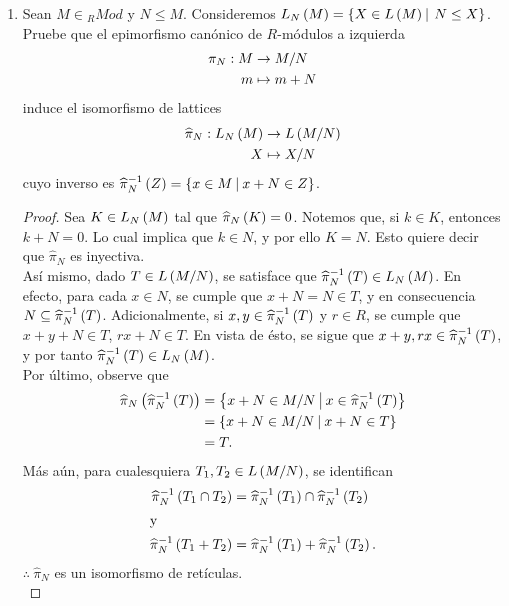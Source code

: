 \documentclass{article}
\begin{document}
\begin{enumerate}[label=\textbf{Ej \arabic*.}]
		\item Sean $M \in {}_{R}Mod$ y $N \leq M$. Consideremos $L_{N}\lrprth{M}=\descset{X}{L\lrprth{M}}{N \leq X}$. Pruebe que el epimorfismo canónico de $R$-módulos a izquierda
		\begin{align*}
			\pi_{N}: M &\rightarrow M/N\\ m &\mapsto m+N 
		\end{align*}
		induce el isomorfismo de lattices
		\begin{align*}
			\widehat{\pi}_{N}: L_{N}\left(M\right) &\rightarrow L\left(M/N\right)\\ X &\mapsto X/N 
		\end{align*}
		cuyo inverso es $\widehat{\pi}_{N}^{-1} \lrprth{Z}=\descset{x}{M}{x+N \in Z}$.
		\begin{proof}
			Sea $K \in L_{N}\left(M\right)$ tal que $\widehat{\pi}_{N} \left(K\right)=0$. Notemos que, si $k \in K$, entonces $k+N=0$. Lo cual implica que $k \in N$, y por ello $K=N$. Esto quiere decir que $\widehat{\pi}_{N}$ es inyectiva.\\
			
			Así mismo, dado $T \in L\left(M/N\right)$, se satisface que $\widehat{\pi}_{N}^{-1} \left(T\right) \in L_{N} \left(M\right)$. En efecto, para cada $x \in N$, se cumple que $x+N=N \in T$, y en consecuencia $N \subseteq \widehat{\pi}_{N}^{-1} \left(T\right)$. Adicionalmente, si $x,y \in \widehat{\pi}_{N}^{-1}\left(T\right)$ y $r \in R$, se cumple que $x+y+N \in T$, $rx+N \in T$. En vista de ésto, se sigue que $x+y, rx \in \widehat{\pi}_{N}^{-1} \left(T\right)$, y por tanto $\widehat{\pi}_{N}^{-1} \left(T\right) \in L_{N} \left(M\right)$.\\
			
			Por último, observe que
			\begin{align*}
				\widehat{\pi}_{N} \lrprth{ \widehat{\pi}_{N}^{-1} \lrprth{T}}&=\descset{x+N}{M/N}{x \in \widehat{\pi}_{N}^{-1} \lrprth{T}}\\
				&=\descset{x+N}{M/N}{x+N \in T}\\
				&=T.
			\end{align*}
			Más aún, para cualesquiera $T_{1},T_{2} \in L\left(M/N\right)$, se identifican
			\begin{align*}
				\widehat{\pi}_{N}^{-1} \left(T_{1} \cap T_{2}\right) &= \widehat{\pi}_{N}^{-1} \left(T_{1}\right) \cap \widehat{\pi}_{N}^{-1} \left(T_{2}\right)\\
				\intertext{y}
				\widehat{\pi}_{N}^{-1} \left(T_{1}+T_{2}\right) &= \widehat{\pi}_{N}^{-1} \left(T_{1}\right) + \widehat{\pi}_{N}^{-1} \left(T_{2}\right).
			\end{align*}
			$\therefore\ \widehat{\pi}_{N}$ es un isomorfismo de retículas.\\
		\end{proof}
		

\end{enumerate}
\end{document}
